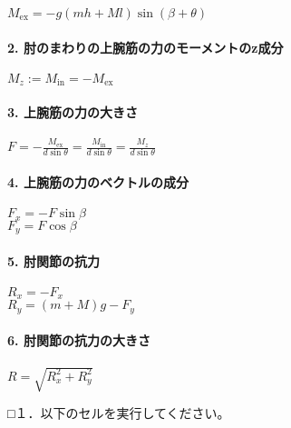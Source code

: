 \documentclass[11pt]{article}
\begin{document}
\(M_{\mathrm{ex}} = -g(mh+Ml)\sin{(\beta+\theta)}\)

\paragraph{2.
肘のまわりの上腕筋の力のモーメントのz成分}\label{ux8098ux306eux307eux308fux308aux306eux4e0aux8155ux7b4bux306eux529bux306eux30e2ux30fcux30e1ux30f3ux30c8ux306ezux6210ux5206}

\(M_z := M_{\mathrm{in}} = -M_{\mathrm{ex}}\)

\paragraph{3.
上腕筋の力の大きさ}\label{ux4e0aux8155ux7b4bux306eux529bux306eux5927ux304dux3055}

\(F = -\frac{M_{\mathrm{ex}}}{d\sin{\theta}}=\frac{M_{\mathrm{in}}}{d\sin{\theta}}=\frac{M_{z}}{d\sin{\theta}}\)

\paragraph{4.
上腕筋の力のベクトルの成分}\label{ux4e0aux8155ux7b4bux306eux529bux306eux30d9ux30afux30c8ux30ebux306eux6210ux5206}

\(F_{x} = -F\sin{\beta}\)\\
\(F_{y} = F\cos{\beta}\)

\paragraph{5. 肘関節の抗力}\label{ux8098ux95a2ux7bc0ux306eux6297ux529b}

\(R_{x} = -F_{x}\)\\
\(R_{y} = (m+M)g - F_{y}\)

\paragraph{6.
肘関節の抗力の大きさ}\label{ux8098ux95a2ux7bc0ux306eux6297ux529bux306eux5927ux304dux3055}

\(R = \sqrt{R_{x}^2+R_{y}^2}\)

    □１．以下のセルを実行してください。
\end{document}
